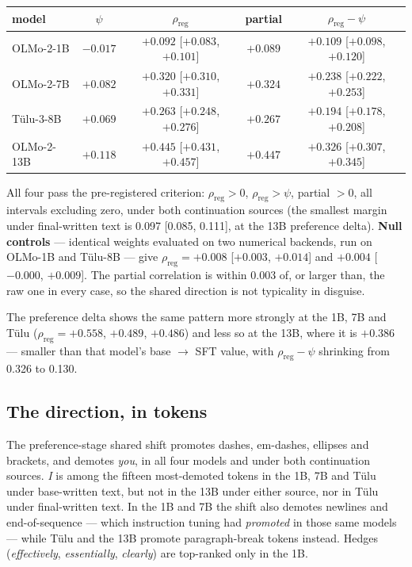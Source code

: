 \documentclass[11pt]{article}
\newcommand{\rreg}{\rho_{\mathrm{reg}}}
\begin{document}
\begin{center}
\begin{tabular}{lcccc}
\toprule
model & $\psi$ & $\rreg$ & partial & $\rreg - \psi$ \\
\midrule
OLMo-2-1B & $-0.017$ & $\mathbf{+0.092}$ [$+0.083$, $+0.101$] & $+0.089$ & $+0.109$ [$+0.098$, $+0.120$] \\
OLMo-2-7B & $+0.082$ & $\mathbf{+0.320}$ [$+0.310$, $+0.331$] & $+0.324$ & $+0.238$ [$+0.222$, $+0.253$] \\
T\"ulu-3-8B & $+0.069$ & $\mathbf{+0.263}$ [$+0.248$, $+0.276$] & $+0.267$ & $+0.194$ [$+0.178$, $+0.208$] \\
OLMo-2-13B & $+0.118$ & $\mathbf{+0.445}$ [$+0.431$, $+0.457$] & $+0.447$ & $+0.326$ [$+0.307$, $+0.345$] \\
\bottomrule
\end{tabular}
\end{center}

All four pass the pre-registered criterion: $\rreg > 0$, $\rreg > \psi$,
partial $> 0$, all intervals excluding zero, under both continuation sources (the
smallest margin under final-written text is 0.097 [0.085, 0.111], at the 13B
preference delta). \textbf{Null controls} --- identical weights evaluated on two
numerical backends, run on OLMo-1B and T\"ulu-8B --- give $\rreg = +0.008$
[$+0.003$, $+0.014$] and $+0.004$ [$-0.000$, $+0.009$]. The partial correlation is
within 0.003 of, or larger than, the raw one in every case, so the shared direction
is not typicality in disguise.

The preference delta shows the same pattern more strongly at the 1B, 7B and T\"ulu
($\rreg = +0.558$, $+0.489$, $+0.486$) and less so at the 13B, where it is $+0.386$
--- smaller than that model's base $\to$ SFT value, with $\rreg - \psi$ shrinking
from 0.326 to 0.130.

\subsection{The direction, in tokens}

The preference-stage shared shift promotes dashes, em-dashes, ellipses and
brackets, and demotes \emph{you}, in all four models and under both continuation
sources. \emph{I} is among the fifteen most-demoted tokens in the 1B, 7B and T\"ulu
under base-written text, but not in the 13B under either source, nor in T\"ulu
under final-written text. In the 1B and 7B the shift also demotes newlines and
end-of-sequence --- which instruction tuning had \emph{promoted} in those same
models --- while T\"ulu and the 13B promote paragraph-break tokens instead. Hedges
(\emph{effectively}, \emph{essentially}, \emph{clearly}) are top-ranked only in the
1B.
\end{document}
